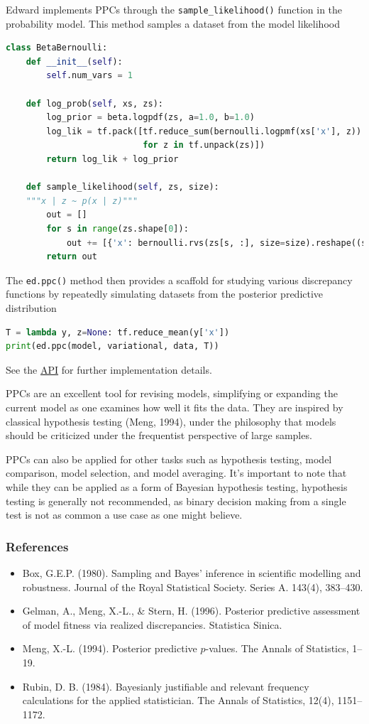 Edward implements PPCs through the \texttt{sample_likelihood()}
function in the probability model. This method samples a dataset from the
model likelihood
\begin{lstlisting}[language=Python]
class BetaBernoulli:
    def __init__(self):
        self.num_vars = 1

    def log_prob(self, xs, zs):
        log_prior = beta.logpdf(zs, a=1.0, b=1.0)
        log_lik = tf.pack([tf.reduce_sum(bernoulli.logpmf(xs['x'], z))
                           for z in tf.unpack(zs)])
        return log_lik + log_prior

    def sample_likelihood(self, zs, size):
    """x | z ~ p(x | z)"""
        out = []
        for s in range(zs.shape[0]):
            out += [{'x': bernoulli.rvs(zs[s, :], size=size).reshape((size,))}]
        return out
\end{lstlisting}

The \texttt{ed.ppc()} method then provides a scaffold for studying
various discrepancy functions by repeatedly simulating datasets from the
posterior predictive distribution
\begin{lstlisting}[language=Python]
T = lambda y, z=None: tf.reduce_mean(y['x'])
print(ed.ppc(model, variational, data, T))
\end{lstlisting}

See the \href{api/index.html}{API} for further implementation details.

PPCs are an excellent tool for revising models, simplifying or
expanding the current model as one examines how well it fits the data.
They are inspired by classical hypothesis testing (Meng, 1994),
under the philosophy that models should be criticized under the
frequentist perspective of large samples.

PPCs can also be applied for other tasks such as hypothesis testing,
model comparison, model selection, and model averaging.  It's
important to note that while they can be applied as a form of Bayesian
hypothesis testing, hypothesis testing is generally not recommended,
as binary decision making from a single test is not as common a use
case as one might believe.

\subsubsection{References}\label{references}

\begin{itemize}
\item
  Box, G.E.P. (1980). Sampling and Bayes' inference in scientific modelling and
  robustness. Journal of the Royal Statistical Society. Series A. 143(4), 383–430.
\item
  Gelman, A., Meng, X.-L., \& Stern, H. (1996). Posterior predictive assessment
  of model fitness via realized discrepancies. Statistica Sinica.
\item
  Meng, X.-L. (1994). Posterior predictive $p$-values. The Annals of
  Statistics, 1–19.
\item
  Rubin, D. B. (1984). Bayesianly justifiable and relevant frequency
  calculations for the applied statistician. The Annals of Statistics,
  12(4), 1151–1172.
\end{itemize}
